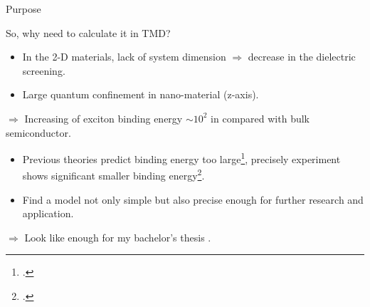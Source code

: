 \documentclass{beamer}
\begin{document}
\begin{frame}{Purpose}
\begin{center}
	So, why need to calculate it in TMD?
\end{center}
\begin{itemize}
\item In the 2-D materials, lack of system dimension $\Rightarrow$ decrease in the dielectric screening.
\item Large quantum confinement in nano-material (z-axis).
\end{itemize}
$\Rightarrow$ Increasing of exciton binding energy \(\sim 10^2\) in compared with bulk semiconductor.\\
\begin{itemize}
\item Previous theories predict binding energy too large\footcite{ramasubramaniam_large_2012,qiu_optical_2013}, precisely experiment shows significant smaller binding energy\footcite{zhang_absorption_2014}.
\item Find a model not only simple but also precise enough for further research and application.
\end{itemize}
$\Rightarrow$ Look like enough for my bachelor's thesis \smiley{}.
\end{frame}
\end{document}
